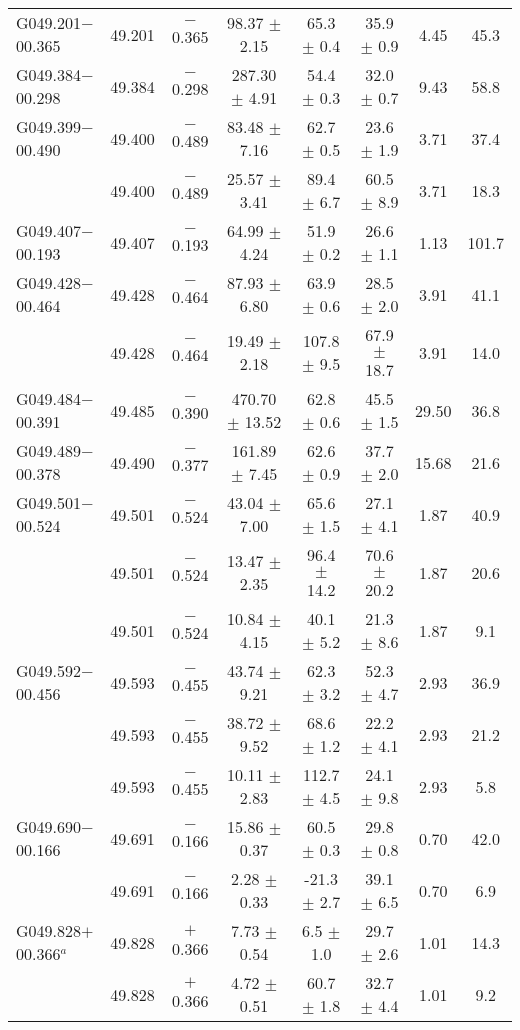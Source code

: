 \begin{ThreePartTable}
\begin{longtable}{lccccccc}
G049.201$-$00.365     &49.201&	$-$0.365	&98.37	$\pm$ 2.15	&65.3	$\pm$ 0.4	&35.9	$\pm$ 0.9	&4.45	&45.3\\
G049.384$-$00.298     &49.384&	$-$0.298	&287.30	$\pm$ 4.91	&54.4	$\pm$ 0.3	&32.0	$\pm$ 0.7	&9.43	&58.8\\
G049.399$-$00.490     &49.400&	$-$0.489	&83.48	$\pm$ 7.16	&62.7	$\pm$ 0.5	&23.6	$\pm$ 1.9	&3.71	&37.4\\
                      &49.400&	$-$0.489	&25.57	$\pm$ 3.41	&89.4	$\pm$ 6.7	&60.5	$\pm$ 8.9	&3.71	&18.3\\
G049.407$-$00.193     &49.407&	$-$0.193	&64.99	$\pm$ 4.24	&51.9	$\pm$ 0.2	&26.6	$\pm$ 1.1	&1.13	&101.7\\
G049.428$-$00.464     &49.428&	$-$0.464	&87.93	$\pm$ 6.80	&63.9	$\pm$ 0.6	&28.5	$\pm$ 2.0	&3.91	&41.1\\
                      &49.428&	$-$0.464	&19.49	$\pm$ 2.18	&107.8	$\pm$ 9.5	&67.9	$\pm$ 18.7	&3.91	&14.0\\
G049.484$-$00.391     &49.485&	$-$0.390	&470.70	$\pm$ 13.52	&62.8	$\pm$ 0.6	&45.5	$\pm$ 1.5	&29.50	&36.8\\
G049.489$-$00.378     &49.490&	$-$0.377	&161.89	$\pm$ 7.45	&62.6	$\pm$ 0.9	&37.7	$\pm$ 2.0	&15.68	&21.6\\
G049.501$-$00.524     &49.501&	$-$0.524	&43.04	$\pm$ 7.00	&65.6	$\pm$ 1.5	&27.1	$\pm$ 4.1	&1.87	&40.9\\
                      &49.501&	$-$0.524	&13.47	$\pm$ 2.35	&96.4	$\pm$ 14.2	&70.6	$\pm$ 20.2	&1.87	&20.6\\
                      &49.501&	$-$0.524	&10.84	$\pm$ 4.15	&40.1	$\pm$ 5.2	&21.3	$\pm$ 8.6	&1.87	&9.1\\
G049.592$-$00.456     &49.593&	$-$0.455	&43.74	$\pm$ 9.21	&62.3	$\pm$ 3.2	&52.3	$\pm$ 4.7	&2.93	&36.9\\
                      &49.593&	$-$0.455	&38.72	$\pm$ 9.52	&68.6	$\pm$ 1.2	&22.2	$\pm$ 4.1	&2.93	&21.2\\
                      &49.593&	$-$0.455	&10.11	$\pm$ 2.83	&112.7	$\pm$ 4.5	&24.1	$\pm$ 9.8	&2.93	&5.8\\
G049.690$-$00.166     &49.691&	$-$0.166	&15.86	$\pm$ 0.37	&60.5	$\pm$ 0.3	&29.8	$\pm$ 0.8	&0.70	&42.0\\
                      &49.691&	$-$0.166	&2.28	$\pm$ 0.33	&-21.3	$\pm$ 2.7	&39.1	$\pm$ 6.5	&0.70	&6.9\\
G049.828$+$00.366$^a$ &49.828&	$+$0.366	&7.73	$\pm$ 0.54	&6.5	$\pm$ 1.0	&29.7	$\pm$ 2.6	&1.01	&14.3\\
                      &49.828&	$+$0.366	&4.72	$\pm$ 0.51	&60.7	$\pm$ 1.8	&32.7	$\pm$ 4.4	&1.01	&9.2\\

\end{longtable}
\end{ThreePartTable}
